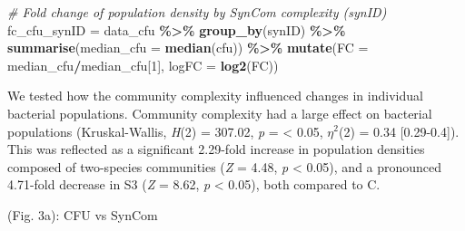 \documentclass[
]{article}
\newenvironment{Shaded}{\begin{snugshade}}{\end{snugshade}}
\newcommand{\AttributeTok}[1]{\textcolor[rgb]{0.13,0.29,0.53}{#1}}
\newcommand{\CommentTok}[1]{\textcolor[rgb]{0.56,0.35,0.01}{\textit{#1}}}
\newcommand{\DecValTok}[1]{\textcolor[rgb]{0.00,0.00,0.81}{#1}}
\newcommand{\FunctionTok}[1]{\textcolor[rgb]{0.13,0.29,0.53}{\textbf{#1}}}
\newcommand{\NormalTok}[1]{#1}
\newcommand{\OtherTok}[1]{\textcolor[rgb]{0.56,0.35,0.01}{#1}}
\newcommand{\SpecialCharTok}[1]{\textcolor[rgb]{0.81,0.36,0.00}{\textbf{#1}}}
\begin{document}
\begin{Shaded}
\begin{Highlighting}[]
\CommentTok{\# Fold change of population density by SynCom complexity (synID)}
\NormalTok{fc\_cfu\_synID }\OtherTok{=}\NormalTok{ data\_cfu }\SpecialCharTok{\%\textgreater{}\%} 
    \FunctionTok{group\_by}\NormalTok{(synID) }\SpecialCharTok{\%\textgreater{}\%} 
    \FunctionTok{summarise}\NormalTok{(}\AttributeTok{median\_cfu =} \FunctionTok{median}\NormalTok{(cfu)) }\SpecialCharTok{\%\textgreater{}\%} 
    \FunctionTok{mutate}\NormalTok{(}\AttributeTok{FC =}\NormalTok{ median\_cfu}\SpecialCharTok{/}\NormalTok{median\_cfu[}\DecValTok{1}\NormalTok{],}
           \AttributeTok{logFC =} \FunctionTok{log2}\NormalTok{(FC))}
\end{Highlighting}
\end{Shaded}

We tested how the community complexity influenced changes in individual
bacterial populations. Community complexity had a large effect on
bacterial populations (Kruskal-Wallis, \emph{H}(2) = 307.02, \emph{p} =
\textless{} 0.05, \(\eta^{2}\)(2) = 0.34 {[}0.29-0.4{]}). This was
reflected as a significant 2.29-fold increase in population densities
composed of two-species communities (\emph{Z} = 4.48, \emph{p}
\textless{} 0.05), and a pronounced 4.71-fold decrease in S3 (\emph{Z} =
8.62, \emph{p} \textless{} 0.05), both compared to C.

(Fig. 3a): CFU vs SynCom
\end{document}
